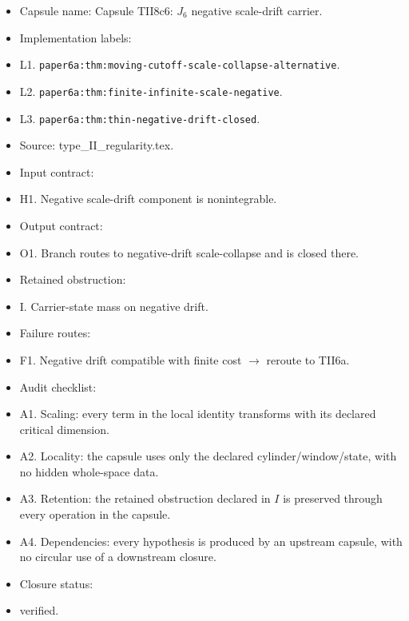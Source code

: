 \documentclass[11pt]{amsart}
\begin{document}
\begin{itemize}
  \item Capsule name: Capsule TII8c6: $J_6$ negative scale-drift carrier.
  \item Implementation labels:
  \item L1. \texttt{paper6a:thm:moving-cutoff-scale-collapse-alternative}.
  \item L2. \texttt{paper6a:thm:finite-infinite-scale-negative}.
  \item L3. \texttt{paper6a:thm:thin-negative-drift-closed}.
  \item Source: type\_II\_regularity.tex.
  \item Input contract:
  \item H1. Negative scale-drift component is nonintegrable.
  \item Output contract:
  \item O1. Branch routes to negative-drift scale-collapse and is closed there.
  \item Retained obstruction:
  \item I. Carrier-state mass on negative drift.
  \item Failure routes:
  \item F1. Negative drift compatible with finite cost $\to$ reroute to TII6a.
  \item Audit checklist:
  \item A1. Scaling: every term in the local identity transforms with its declared critical dimension.
  \item A2. Locality: the capsule uses only the declared cylinder/window/state, with no hidden whole-space data.
  \item A3. Retention: the retained obstruction declared in $I$ is preserved through every operation in the capsule.
  \item A4. Dependencies: every hypothesis is produced by an upstream capsule, with no circular use of a downstream closure.
  \item Closure status:
  \item verified.
\end{itemize}
\end{document}
